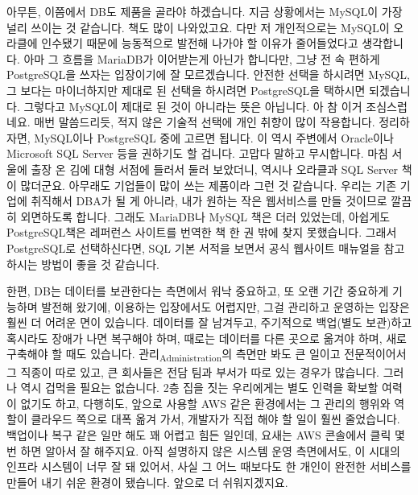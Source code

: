 \documentclass[11pt,a4paper]{article}
\begin{document}
아무튼, 이쯤에서 DB도 제품을 골라야 하겠습니다. 지금 상황에서는 MySQL이 가장 널리 쓰이는 것 같습니다. 책도 많이 나와있고요. 다만 저 개인적으로는 MySQL이 오라클에 인수됐기 때문에 능동적으로 발전해 나가야 할 이유가 줄어들었다고 생각합니다. 아마 그 흐름을 MariaDB가 이어받는게 아닌가 합니다만, 그냥 전 속 편하게 PostgreSQL을 쓰자는 입장이기에 잘 모르겠습니다. 안전한 선택을 하시려면 MySQL, 그 보다는 마이너하지만 제대로 된 선택을 하시려면 PostgreSQL을 택하시면 되겠습니다. 그렇다고 MySQL이 제대로 된 것이 아니라는 뜻은 아닙니다. 아 참 이거 조심스럽네요. 매번 말씀드리듯, 적지 않은 기술적 선택에 개인 취향이 많이 작용합니다. 정리하자면, MySQL이나 PostgreSQL 중에 고르면 됩니다. 이 역시 주변에서 Oracle이나 Microsoft SQL Server 등을 권하기도 할 겁니다. 고맙다 말하고 무시합니다. 마침 서울에 출장 온 김에 대형 서점에 들러서 둘러 보았더니, 역시나 오라클과 SQL Server 책이 많더군요. 아무래도 기업들이 많이 쓰는 제품이라 그런 것 같습니다. 우리는 기존 기업에 취직해서 DBA가 될 게 아니라, 내가 원하는 작은 웹서비스를 만들 것이므로 깔끔히 외면하도록 합니다. 그래도 MariaDB나 MySQL 책은 더러 있었는데, 아쉽게도 PostgreSQL책은 레퍼런스 사이트를 번역한 책 한 권 밖에 찾지 못했습니다. 그래서 PostgreSQL로 선택하신다면, SQL 기본 서적을 보면서 공식 웹사이트 매뉴얼을 참고하시는 방법이 좋을 것 같습니다.

한편, DB는 데이터를 보관한다는 측면에서 워낙 중요하고, 또 오랜 기간 중요하게 기능하며 발전해 왔기에, 이용하는 입장에서도 어렵지만, 그걸 관리하고 운영하는 입장은 훨씬 더 어려운 면이 있습니다. 데이터를 잘 남겨두고, 주기적으로 백업(별도 보관)하고 혹시라도 장애가 나면 복구해야 하며, 때로는 데이터를 다른 곳으로 옮겨야 하며, 새로 구축해야 할 때도 있습니다.  관리\textsubscript{Administration}의 측면만 봐도 큰 일이고 전문적이어서 그 직종이 따로 있고, 큰 회사들은 전담 팀과 부서가 따로 있는 경우가 많습니다. 그러나 역시 겁먹을 필요는 없습니다. 2층 집을 짓는 우리에게는 별도 인력을 확보할 여력이 없기도 하고, 다행히도, 앞으로 사용할 AWS 같은 환경에서는 그 관리의 행위와 역할이 클라우드 쪽으로 대폭 옮겨 가서, 개발자가 직접 해야 할 일이 훨씬 줄었습니다. 백업이나 복구 같은 일만 해도 꽤 어렵고 힘든 일인데, 요새는 AWS 콘솔에서 클릭 몇 번 하면 알아서 잘 해주지요. 아직 설명하지 않은 시스템 운영 측면에서도, 이 시대의 인프라 시스템이 너무 잘 돼 있어서, 사실 그 어느 때보다도 한 개인이 완전한 서비스를 만들어 내기 쉬운 환경이 됐습니다. 앞으로 더 쉬워지겠지요.
\end{document}
